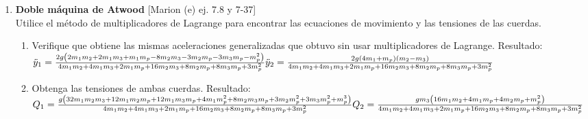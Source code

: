 \documentclass[11pt, spanish, a4paper, twoside]{article}
\begin{document}
\begin{enumerate}
	
	\item
	\begin{minipage}[t][6.5cm]{0.67\textwidth}
	\textbf{Doble máquina de Atwood} [Marion (e) ej. 7.8 y 7-37]\\
	Utilice el método de multiplicadores de Lagrange para encontrar las ecuaciones de movimiento y las tensiones de las cuerdas.
	\begin{enumerate}
		\item Verifique que obtiene las mismas aceleraciones generalizadas que obtuvo sin usar multiplicadores de Lagrange.
		Resultado:\\
		\(
			\ddot{y}_{1} = \frac{2 g \left(2 m_{1} m_{2} + 2 m_{1} m_{3} + m_{1} m_{p} - 8 m_{2} m_{3} - 3 m_{2} m_{p} - 3 m_{3} m_{p} - m_{p}^{2}\right)}{4 m_{1} m_{2} + 4 m_{1} m_{3} + 2 m_{1} m_{p} + 16 m_{2} m_{3} + 8 m_{2} m_{p} + 8 m_{3} m_{p} + 3 m_{p}^{2}}\\
			\ddot{y}_{2} = \frac{2 g \left(4 m_{1} + m_{p}\right) \left(m_{2} - m_{3}\right)}{4 m_{1} m_{2} + 4 m_{1} m_{3} + 2 m_{1} m_{p} + 16 m_{2} m_{3} + 8 m_{2} m_{p} + 8 m_{3} m_{p} + 3 m_{p}^{2}}
		\)
		\item Obtenga las tensiones de ambas cuerdas.
			Resultado:\\
			\(
				Q_{1} = \frac{g \left(32 m_{1} m_{2} m_{3} + 12 m_{1} m_{2} m_{p} + 12 m_{1} m_{3} m_{p} + 4 m_{1} m_{p}^{2} + 8 m_{2} m_{3} m_{p} + 3 m_{2} m_{p}^{2} + 3 m_{3} m_{p}^{2} + m_{p}^{3}\right)}{4 m_{1} m_{2} + 4 m_{1} m_{3} + 2 m_{1} m_{p} + 16 m_{2} m_{3} + 8 m_{2} m_{p} + 8 m_{3} m_{p} + 3 m_{p}^{2}}\\
				Q_{2} = \frac{g m_{3} \left(16 m_{1} m_{2} + 4 m_{1} m_{p} + 4 m_{2} m_{p} + m_{p}^{2}\right)}{4 m_{1} m_{2} + 4 m_{1} m_{3} + 2 m_{1} m_{p} + 16 m_{2} m_{3} + 8 m_{2} m_{p} + 8 m_{3} m_{p} + 3 m_{p}^{2}}
			\)
		\end{enumerate}
	\end{minipage}
	\begin{minipage}[c][0.5cm][t]{0.3\textwidth}
		
	\end{minipage}



\end{enumerate}
\end{document}
